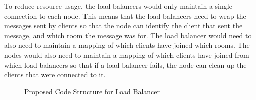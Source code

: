 To reduce resource usage, the load balancers would only maintain a single
connection to each node. This means that the load balancers need to wrap the
messages sent by clients so that the node can identify the client that sent
the message, and which room the message was for. The load balancer would need
to also need to maintain a mapping of which clients have joined which rooms.
The nodes would also need to maintain a mapping of which clients have joined
from which load balancers so that if a load balancer fails, the node can clean
up the clients that were connected to it.

\begin{figure}[htb]
  \centering
  \caption{\label{Figure::uml-load-balancer} Proposed Code Structure for Load Balancer}
\end{figure}
